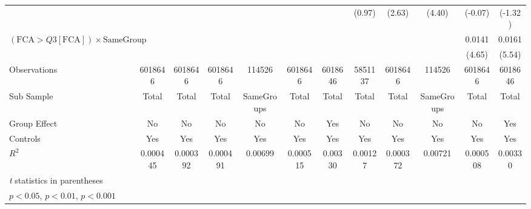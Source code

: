 {\begin{tabular}{l*{11}{c}}
                &                  &                  &                  &                  &                  &                  &   (0.97)         &   (2.63)         &   (4.40)         &  (-0.07)         &  (-1.32)         \\
[1em]
 $ (\text{FCA} > Q3[\text{FCA}]) \times  {\text{SameGroup} }  $ &                  &                  &                  &                  &                  &                  &                  &                  &                  &   0.0141\sym{***}&   0.0161\sym{***}\\
                &                  &                  &                  &                  &                  &                  &                  &                  &                  &   (4.65)         &   (5.54)         \\
\hline
Observations    &  6018646         &  6018646         &  6018646         &   114526         &  6018646         &  6018646         &  5851137         &  6018646         &   114526         &  6018646         &  6018646         \\
Sub Sample      &    Total         &    Total         &    Total         &SameGroups         &    Total         &    Total         &    Total         &    Total         &SameGroups         &    Total         &    Total         \\
Group Effect    &       No         &       No         &       No         &       No         &       No         &      Yes         &       No         &       No         &       No         &       No         &      Yes         \\
Controls        &      Yes         &      Yes         &      Yes         &      Yes         &      Yes         &      Yes         &      Yes         &      Yes         &      Yes         &      Yes         &      Yes         \\
$ R^2 $         & 0.000445         & 0.000392         & 0.000491         &  0.00699         & 0.000515         &  0.00330         &  0.00127         & 0.000372         &  0.00721         & 0.000508         &  0.00330         \\
\hline\hline
\multicolumn{12}{l}{\footnotesize \textit{t} statistics in parentheses}\\
\multicolumn{12}{l}{\footnotesize \sym{*} \(p<0.05\), \sym{**} \(p<0.01\), \sym{***} \(p<0.001\)}\\
\end{tabular}
}
